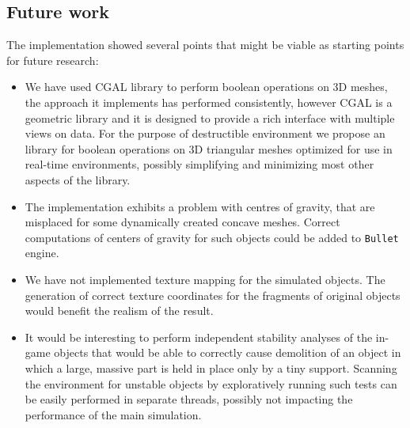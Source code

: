 \subsection*{Future work}
The implementation showed several points that might be viable as starting points for future research:
\begin{itemize}
\item We have used CGAL library to perform boolean operations on 3D meshes, the approach it implements has performed consistently, however CGAL is a geometric library and it is designed to provide a rich interface with multiple views on data. For the purpose of destructible environment we propose an library for boolean operations on 3D triangular meshes optimized for use in real-time environments, possibly simplifying and minimizing most other aspects of the library.

\item The implementation exhibits a problem with centres of gravity, that are misplaced for some dynamically created concave meshes. Correct computations of centers of gravity for such objects could be added to \texttt{Bullet} engine.

\item We have not implemented texture mapping for the simulated objects. The generation of correct texture coordinates for the fragments of original objects would benefit the realism of the result.

\item It would be interesting to perform independent stability analyses of the in-game objects that would be able to \eg correctly cause demolition of an object in which a large, massive part is held in place only by a tiny support. Scanning the environment for unstable objects by exploratively running such tests can be easily performed in separate threads, \ie possibly not impacting the performance of the main simulation.

\end{itemize}

